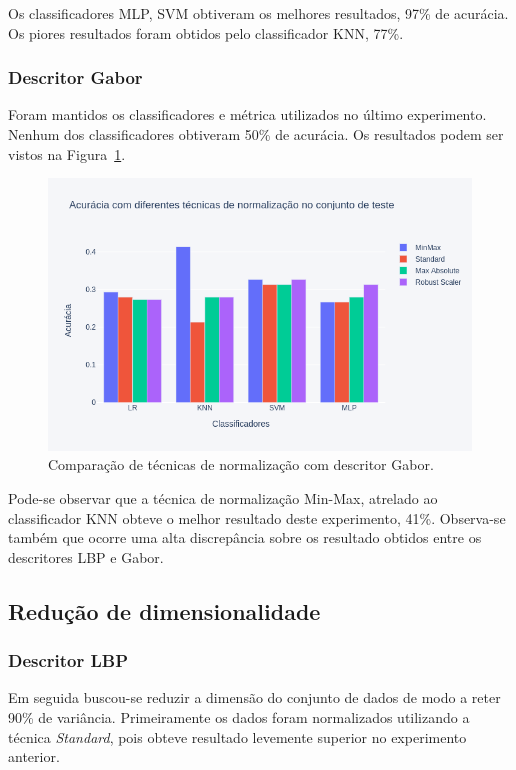 Os classificadores MLP, SVM obtiveram os melhores resultados, 97\% de acurácia. Os piores resultados foram obtidos pelo classificador KNN, 77\%.

\subsubsection{Descritor Gabor}
Foram mantidos os classificadores e métrica utilizados no último experimento. Nenhum dos classificadores obtiveram 50\% de acurácia. Os resultados podem ser vistos na Figura~\ref{fig:bar_norm_all_gabor}.

\begin{figure}[!htbp]
	\centering
	\includegraphics[width=1.0\linewidth,clip=true,trim=0cm 0cm 0cm 0cm, keepaspectratio=true]{bar_norm_all_gabor.png}
	\caption{Comparação de técnicas de normalização com descritor Gabor.}
	\label{fig:bar_norm_all_gabor}
\end{figure}

Pode-se observar que a técnica de normalização Min-Max, atrelado ao classificador KNN obteve o melhor resultado deste experimento, 41\%. Observa-se também que ocorre uma alta discrepância sobre os resultado obtidos entre os descritores LBP e Gabor.

\subsection{Redução de dimensionalidade}
\subsubsection{Descritor LBP}
Em seguida buscou-se reduzir a dimensão do conjunto de dados de modo a reter 90\% de variância. Primeiramente os dados foram normalizados utilizando a técnica \textit{Standard}, pois obteve resultado levemente superior no experimento anterior.

